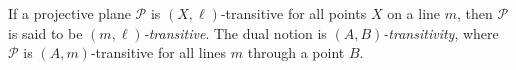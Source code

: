 If a projective plane $\mathcal{P}$ is $(X,\ell)$-transitive for all points $X$ on a line $m$, then $\mathcal{P}$ is said to be \emph{$(m,\ell)$-transitive}. The dual notion is \emph{$(A,B)$-transitivity}, where $\mathcal{P}$ is $(A,m)$-transitive for all lines $m$ through a point $B$.
